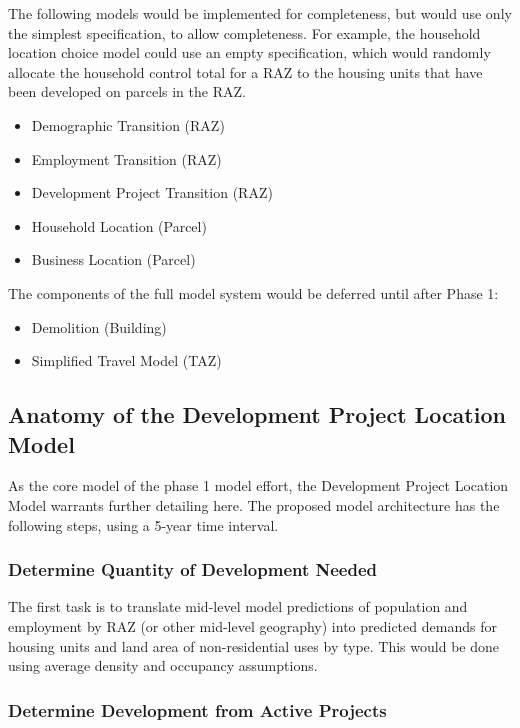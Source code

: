 The following models would be implemented for completeness, but would
use only the simplest specification, to allow completeness.  For example,
the household location choice model could use an empty specification,
which would randomly allocate the household control total for a RAZ to
the housing units that have been developed on parcels in the RAZ.

\begin{itemize}
\item Demographic Transition (RAZ)
\item Employment Transition (RAZ)
\item Development Project Transition (RAZ)
\item Household Location (Parcel)
\item Business Location (Parcel)
\end{itemize}

The components of the full model system would be deferred until after Phase 1:

\begin{itemize}
\item Demolition (Building)
\item Simplified Travel Model (TAZ)
\end{itemize}


\subsection{Anatomy of the Development Project Location Model}
As the core model of the phase 1 model effort, the Development
Project Location Model warrants further detailing here.  The
proposed model architecture has the following steps, using a 5-year
time interval.

\subsubsection{Determine Quantity of Development Needed}

The first task is to translate mid-level model predictions of population and employment by RAZ (or
other mid-level geography) into predicted demands for housing units and land area of non-residential
uses by type. This would be done using average density and occupancy assumptions.

\subsubsection{Determine Development from Active Projects}

